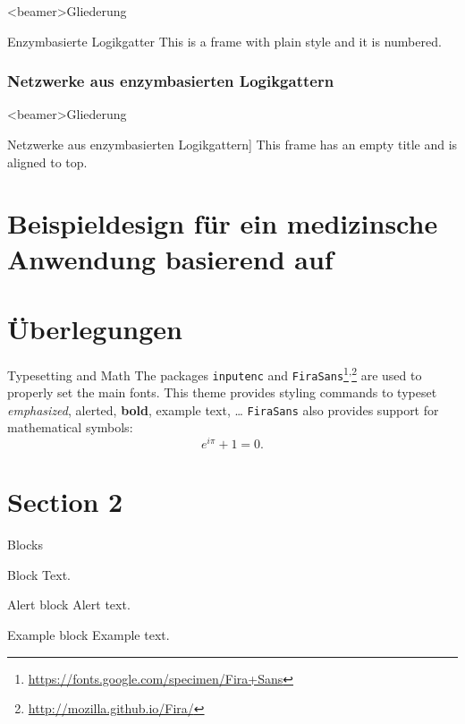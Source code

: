 \documentclass{beamer}
\begin{document}
	\begin{frame}<beamer>{Gliederung}
	\end{frame}

    \begin{frame}{Enzymbasierte Logikgatter}
        This is a frame with plain style and it is numbered.
    \end{frame}


    \subsubsection{Netzwerke aus enzymbasierten Logikgattern}
    \begin{frame}<beamer>{Gliederung}
	\end{frame}
    
    \begin{frame}{Netzwerke aus enzymbasierten Logikgattern]}
        This frame has an empty title and is aligned to top.
    \end{frame}
    
   \section{Beispieldesign für ein medizinsche Anwendung basierend auf }
   \section{{\"U}berlegungen}
   
    \begin{frame}{Typesetting and Math}
        The packages \texttt{inputenc} and \texttt{FiraSans}\footnote{\url{https://fonts.google.com/specimen/Fira+Sans}}\textsuperscript{,}\footnote{\url{http://mozilla.github.io/Fira/}} are used to properly set the main fonts.
        \vfill
        This theme provides styling commands to typeset \emph{emphasized}, \alert{alerted}, \textbf{bold}, \textcolor{example}{example text}, \dots
        \vfill
        \texttt{FiraSans} also provides support for mathematical symbols:
        \begin{equation*}
            e^{i\pi} + 1 = 0.
        \end{equation*}
    \end{frame}

    \section{Section 2}
    \begin{frame}{Blocks}
        \begin{block}{Block}
            Text.
        \end{block}
        \pause
        \begin{alertblock}{Alert block}
            Alert \alert{text}.
        \end{alertblock}
        \pause
        \begin{exampleblock}{Example block}
            Example \textcolor{example}{text}.
        \end{exampleblock}
    \end{frame}
    
\end{document}
